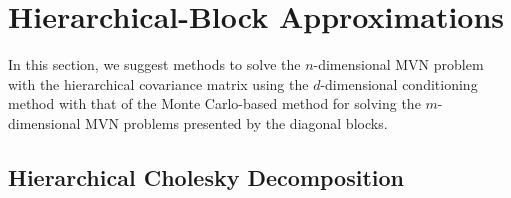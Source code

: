 
\section{Hierarchical-Block Approximations}\label{sec:hmvn}

In this section, we suggest methods to solve the $n$-dimensional MVN problem with the hierarchical covariance matrix using the $d$-dimensional conditioning method with that of the Monte Carlo-based method for solving the $m$-dimensional MVN problems presented by the diagonal blocks.

\subsection{Hierarchical Cholesky Decomposition}

